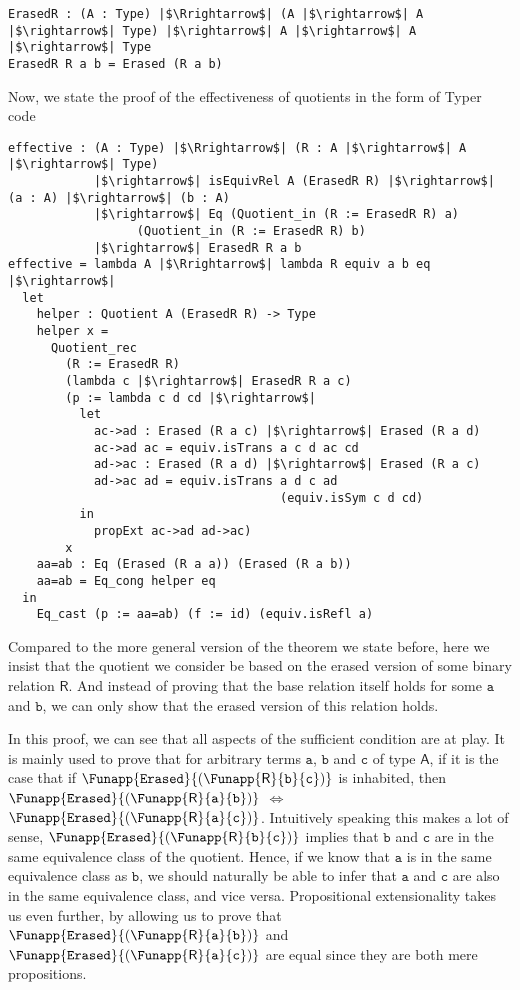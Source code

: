 \documentclass[12pt,twoside,maitrise]{dms}
\theoremstyle{definition}
\numberwithin{equation}{section}
\numberwithin{table}{chapter}
\numberwithin{figure}{chapter}
\newcommand\kw[1] {\textsf{#1}}
\newcommand\id[1] {\texttt{#1}}
\begin{document}
\begin{verbatim}
ErasedR : (A : Type) |$\Rrightarrow$| (A |$\rightarrow$| A |$\rightarrow$| Type) |$\rightarrow$| A |$\rightarrow$| A |$\rightarrow$| Type
ErasedR R a b = Erased (R a b)
\end{verbatim}

Now, we state the proof of the effectiveness of quotients in the form of Typer code

\begin{verbatim}
effective : (A : Type) |$\Rrightarrow$| (R : A |$\rightarrow$| A |$\rightarrow$| Type)
            |$\rightarrow$| isEquivRel A (ErasedR R) |$\rightarrow$| (a : A) |$\rightarrow$| (b : A)
            |$\rightarrow$| Eq (Quotient_in (R := ErasedR R) a)
                  (Quotient_in (R := ErasedR R) b)
            |$\rightarrow$| ErasedR R a b
effective = lambda A |$\Rrightarrow$| lambda R equiv a b eq |$\rightarrow$|
  let
    helper : Quotient A (ErasedR R) -> Type
    helper x =
      Quotient_rec
        (R := ErasedR R)
        (lambda c |$\rightarrow$| ErasedR R a c)
        (p := lambda c d cd |$\rightarrow$|
          let
            ac->ad : Erased (R a c) |$\rightarrow$| Erased (R a d)
            ac->ad ac = equiv.isTrans a c d ac cd
            ad->ac : Erased (R a d) |$\rightarrow$| Erased (R a c)
            ad->ac ad = equiv.isTrans a d c ad
                                      (equiv.isSym c d cd)
          in
            propExt ac->ad ad->ac)
        x
    aa=ab : Eq (Erased (R a a)) (Erased (R a b))
    aa=ab = Eq_cong helper eq
  in
    Eq_cast (p := aa=ab) (f := id) (equiv.isRefl a)
\end{verbatim}

Compared to the more general version of the theorem we state before, here we insist that the quotient we consider be based on the erased version of some binary relation $\kw{R}$. And instead of proving that the base relation itself holds for some $\id{a}$ and $\id{b}$, we can only show that the erased version of this relation holds.

In this proof, we can see that all aspects of the sufficient condition are at
play. It is mainly used to prove that for arbitrary terms $\id{a}$, $\id{b}$ and
$\id{c}$ of type $\kw{A}$, if it is the case that if
$\Funapp{\id{Erased}}{(\Funapp{\kw{R}}{\id{b}}{\id{c}})}$ is inhabited, then
$\Funapp{\id{Erased}}{(\Funapp{\kw{R}}{\id{a}}{\id{b}})}$ $\iff$
$\Funapp{\id{Erased}}{(\Funapp{\kw{R}}{\id{a}}{\id{c}})}$. Intuitively speaking
this makes a lot of sense,
$\Funapp{\id{Erased}}{(\Funapp{\kw{R}}{\id{b}}{\id{c}})}$ implies that $\id{b}$
and $\id{c}$ are in the same equivalence class of the quotient. Hence, if we
know that $\id{a}$ is in the same equivalence class as $\id{b}$, we should
naturally be able to infer that $\id{a}$ and $\id{c}$ are also in the same
equivalence class, and vice versa. Propositional extensionality takes us even
further, by allowing us to prove that
$\Funapp{\id{Erased}}{(\Funapp{\kw{R}}{\id{a}}{\id{b}})}$ and
$\Funapp{\id{Erased}}{(\Funapp{\kw{R}}{\id{a}}{\id{c}})}$ are equal since they
are both mere propositions.
\end{document}
